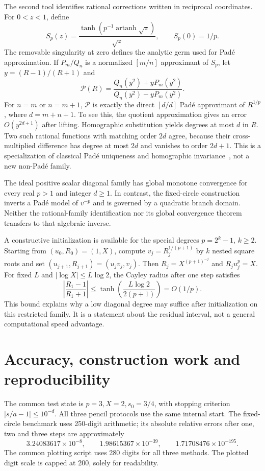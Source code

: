 \documentclass[11pt,a4paper]{article}
\theoremstyle{remark}\newtheorem{remark}[theorem]{Remark}
\newcommand{\artanh}{\operatorname{artanh}}
\begin{document}
The second tool identifies rational corrections written in reciprocal coordinates. For $0<z<1$, define
\[
 S_p(z)=\frac{\tanh(p^{-1}\artanh\sqrt z)}{\sqrt z},\qquad S_p(0)=1/p.
\]
The removable singularity at zero defines the analytic germ used for Pad\'e approximation. If $P_m/Q_n$ is a normalized $[m/n]$ approximant of $S_p$, let $y=(R-1)/(R+1)$ and
\[
 \mathcal P(R)=\frac{Q_n(y^2)+yP_m(y^2)}{Q_n(y^2)-yP_m(y^2)}.
\]
For $n=m$ or $n=m+1$, $\mathcal P$ is exactly the direct $[d/d]$ Pad\'e approximant of $R^{1/p}$, where $d=m+n+1$. To see this, the quotient approximation gives an error $O(y^{2d+1})$ after lifting. Homographic substitution yields degrees at most $d$ in $R$. Two such rational functions with matching order $2d$ agree, because their cross-multiplied difference has degree at most $2d$ and vanishes to order $2d+1$. This is a specialization of classical Pad\'e uniqueness and homographic invariance~\cite{baker1996}, not a new non-Pad\'e family.

The ideal positive scalar diagonal family has global monotone convergence for every real $p>1$ and integer $d\ge1$. In contrast, the fixed-circle construction inverts a Pad\'e model of $v^{-p}$ and is governed by a quadratic branch domain. Neither the rational-family identification nor its global convergence theorem transfers to that algebraic inverse.

A constructive initialization is available for the special degrees $p=2^k-1$, $k\ge2$. Starting from $(u_0,R_0)=(1,X)$, compute $v_j=R_j^{1/(p+1)}$ by $k$ nested square roots and set $(u_{j+1},R_{j+1})=(u_jv_j,v_j)$. Then $R_j=X^{(p+1)^{-j}}$ and $R_ju_j^p=X$. For fixed $L$ and $|\log X|\le L\log2$, the Cayley radius after one step satisfies
\[
 \left|\frac{R_1-1}{R_1+1}\right|\le\tanh\!\left(\frac{L\log2}{2(p+1)}\right)=O(1/p).
\]
This bound explains why a low diagonal degree may suffice after initialization on this restricted family. It is a statement about the residual interval, not a general computational speed advantage.

\section{Accuracy, construction work and reproducibility}\label{sec:evidence}
The common test state is $p=3,X=2,s_0=3/4$, with stopping criterion $|s/a-1|\le10^{-d}$. All three pencil protocols use the same internal start. The fixed-circle benchmark uses 250-digit arithmetic; its absolute relative errors after one, two and three steps are approximately
\[
 3.24083617\times10^{-8},\qquad1.98615367\times10^{-39},\qquad1.71708476\times10^{-195}.
\]
The common plotting script uses 280 digits for all three methods. The plotted digit scale is capped at 200, solely for readability.
\end{document}
